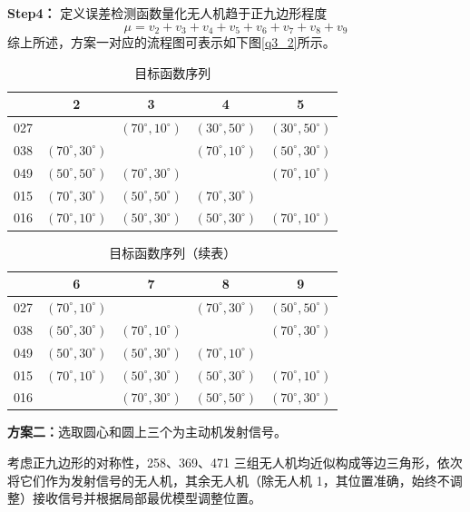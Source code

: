 \documentclass[withoutpreface,bwprint]{cumcmthesis} %
\begin{document}
    \textbf{Step4：} 定义误差检测函数量化无人机趋于正九边形程度
    \begin{equation}
    \mu = v_2 + v_3 + v_4 + v_5 + v_6 + v_7 + v_8 + v_9
    \end{equation}
综上所述，方案一对应的流程图可表示如下图\ref{q3_2}所示。
\begin{table}[H]
  \centering
  \caption{目标函数序列}
  \label{表3}
  \begin{tabular}{ccccc}
    \toprule
    & 2 & 3 & 4 & 5 \\
    \midrule
    027 &  & $(70^\circ, 10^\circ)$ & $(30^\circ, 50^\circ)$ & $(30^\circ, 50^\circ)$ \\
    038 & $(70^\circ, 30^\circ)$ &  & $(70^\circ, 10^\circ)$ & $(50^\circ, 30^\circ)$ \\
    049 & $(50^\circ, 50^\circ)$ & $(70^\circ, 30^\circ)$ &  & $(70^\circ, 10^\circ)$ \\
    015 & $(70^\circ, 30^\circ)$ & $(50^\circ, 50^\circ)$ & $(70^\circ, 30^\circ)$ &  \\
    016 & $(70^\circ, 10^\circ)$ & $(50^\circ, 30^\circ)$ & $(50^\circ, 30^\circ)$ & $(70^\circ, 10^\circ)$ \\
    \bottomrule
  \end{tabular}
\end{table}
\begin{table}[H]
  \centering
  \caption{目标函数序列（续表）}
  \label{表4}
  \begin{tabular}{ccccc}
    \toprule
    & 6 & 7 & 8 & 9 \\
    \midrule
    027 & $(70^\circ, 10^\circ)$ &  & $(70^\circ, 30^\circ)$ & $(50^\circ, 50^\circ)$ \\
    038 & $(50^\circ, 30^\circ)$ & $(70^\circ, 10^\circ)$ &  & $(70^\circ, 30^\circ)$ \\
    049 & $(50^\circ, 30^\circ)$ & $(50^\circ, 30^\circ)$ & $(70^\circ, 10^\circ)$ &  \\
    015 & $(70^\circ, 10^\circ)$ & $(50^\circ, 30^\circ)$ & $(50^\circ, 30^\circ)$ & $(70^\circ, 10^\circ)$ \\
    016 &  & $(70^\circ, 30^\circ)$ & $(50^\circ, 50^\circ)$ & $(70^\circ, 30^\circ)$ \\
    \bottomrule
  \end{tabular}
\end{table}

\noindent \textbf{方案二：}选取圆心和圆上三个为主动机发射信号。

考虑正九边形的对称性，258、369、471 三组无人机均近似构成等边三角形，依次将它们作为发射信号的无人机，其余无人机（除无人机 1，其位置准确，始终不调整）接收信号并根据局部最优模型调整位置。
\end{document}
